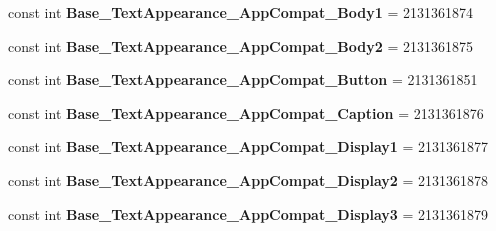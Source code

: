 \begin{DoxyCompactItemize}
\item 
\mbox{\label{class_pinned_app_1_1_droid_1_1_resource_1_1_style_a8b2075262e5e186b7a6544febf8dd1e5}} 
const int {\bfseries Base\+\_\+\+Text\+Appearance\+\_\+\+App\+Compat\+\_\+\+Body1} = 2131361874
\item 
\mbox{\label{class_pinned_app_1_1_droid_1_1_resource_1_1_style_aaa7438133366cf4eb1e401d98fabd39c}} 
const int {\bfseries Base\+\_\+\+Text\+Appearance\+\_\+\+App\+Compat\+\_\+\+Body2} = 2131361875
\item 
\mbox{\label{class_pinned_app_1_1_droid_1_1_resource_1_1_style_afbbf0a2e7ab1c04c07fabbda8c8362fe}} 
const int {\bfseries Base\+\_\+\+Text\+Appearance\+\_\+\+App\+Compat\+\_\+\+Button} = 2131361851
\item 
\mbox{\label{class_pinned_app_1_1_droid_1_1_resource_1_1_style_a571184016d91bc7c13ccd24fb942840b}} 
const int {\bfseries Base\+\_\+\+Text\+Appearance\+\_\+\+App\+Compat\+\_\+\+Caption} = 2131361876
\item 
\mbox{\label{class_pinned_app_1_1_droid_1_1_resource_1_1_style_a3471b51c6486cc53d53c65d8040944e0}} 
const int {\bfseries Base\+\_\+\+Text\+Appearance\+\_\+\+App\+Compat\+\_\+\+Display1} = 2131361877
\item 
\mbox{\label{class_pinned_app_1_1_droid_1_1_resource_1_1_style_a883e76c8921e80b5742cd848023d3d3e}} 
const int {\bfseries Base\+\_\+\+Text\+Appearance\+\_\+\+App\+Compat\+\_\+\+Display2} = 2131361878
\item 
\mbox{\label{class_pinned_app_1_1_droid_1_1_resource_1_1_style_a452d6dff33d4d778d65235e2bdeb7952}} 
const int {\bfseries Base\+\_\+\+Text\+Appearance\+\_\+\+App\+Compat\+\_\+\+Display3} = 2131361879
\item 
\mbox{\label{class_pinned_app_1_1_droid_1_1_resource_1_1_style_acb0fe88e30387bfc09f619d993824cf0}} 

\end{DoxyCompactItemize}
